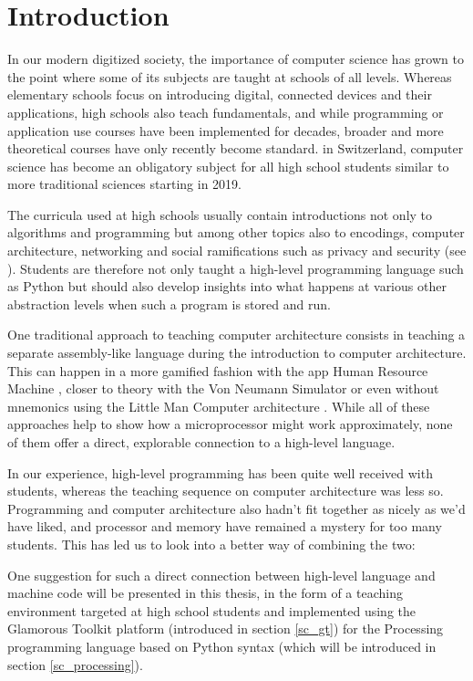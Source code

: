 
\chapter{Introduction}

In our modern digitized society, the importance of computer science has grown to the point where some of its subjects are taught at schools of all levels. Whereas elementary schools focus on introducing digital, connected devices and their applications, high schools also teach fundamentals, and while programming or application use courses have been implemented for decades, broader and more theoretical courses have only recently become standard. \eg in Switzerland, computer science has become an obligatory subject for all high school students similar to more traditional sciences starting in 2019.

The curricula used at high schools usually contain introductions not only to algorithms and programming but among other topics also to encodings, computer architecture, networking and social ramifications such as privacy and security (see \eg \cite{Erz16}). Students are therefore not only taught a high-level programming language such as Python but should also develop insights into what happens at various other abstraction levels when such a program is stored and run.

One traditional approach to teaching computer architecture consists in teaching a separate assembly-like language during the introduction to computer architecture. This can happen in a more gamified fashion \eg with the app Human Resource Machine \cite{Tom15}, closer to theory with the Von Neumann Simulator \cite{Gan23} or even without mnemonics using the Little Man Computer architecture \cite{Oin25}. While all of these approaches help to show how a microprocessor might work approximately, none of them offer a direct, explorable connection to a high-level language.

In our experience, high-level programming has been quite well received with students, whereas the teaching sequence on computer architecture was less so. Programming and computer architecture also hadn't fit together as nicely as we'd have liked, and processor and memory have remained a mystery for too many students. This has led us to look into a better way of combining the two:

One suggestion for such a direct connection between high-level language and machine code will be presented in this thesis, in the form of a teaching environment targeted at high school students and implemented using the Glamorous Toolkit platform (introduced in section \ref{sc_gt}) for the Processing programming language based on Python syntax (which will be introduced in section \ref{sc_processing}).

